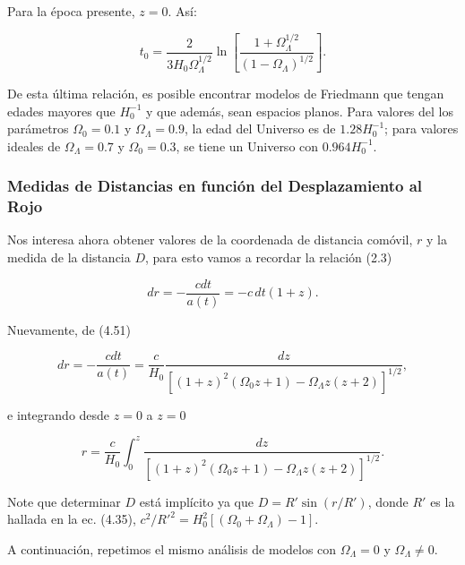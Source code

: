 \documentclass[11pt]{article}
\begin{document}
\begin{itemize}
        Para la época presente, $z=0$. Así: 
        
        \begin{equation}
            t_0 = \frac{2}{3H_0\Omega_{\Lambda}^{1/2}} \ln \left[\frac{1 + \Omega_{\Lambda}^{1/2}}{(1-\Omega_{\Lambda})^{1/2}} \right].
        \end{equation}
        
        De esta última relación, es posible encontrar modelos de Friedmann que tengan edades mayores que $H_0^{-1}$ y que además, sean espacios planos. Para valores del los parámetros $\Omega_0 = 0.1$ y $\Omega_{\Lambda}=0.9$, la edad del Universo es de $1.28 H_0^{-1}$; para valores ideales de $\Omega_{\Lambda} = 0.7$ y $\Omega_0=0.3$, se tiene un Universo con $0.964 H_0^{-1}$. 
    
    \end{itemize}
    
    \subsubsection{Medidas de Distancias en función del Desplazamiento al Rojo}
    
   Nos interesa ahora obtener valores de la coordenada de distancia comóvil, $r$ y la medida de la distancia $D$, para esto vamos a recordar la relación (2.3)
   
   \begin{equation}
       dr = - \frac{cdt}{a(t)} = -c \, dt (1+z).
   \end{equation}
    
    Nuevamente, de (4.51)
    
    \begin{equation}
         dr = - \frac{cdt}{a(t)} = \frac{c}{H_0}  \frac{dz}{[ (1+z)^2 (\Omega_0 z + 1) - \Omega_{\Lambda} z (z+2) ]^{1/2}},
    \end{equation}
    
    e integrando desde $z=0$ a $z=0$
    
    \begin{equation}
        r = \frac{c}{H_0} \int_0^z{\frac{dz}{[ (1+z)^2 (\Omega_0 z + 1) - \Omega_{\Lambda} z (z+2) ]^{1/2}}}.
    \end{equation}
    
    
    Note que determinar $D$ está implícito ya que $D = R' \sin(r/R')$, donde $R'$ es la hallada en la ec. (4.35), $ c^2/R'^2  = H_0^2 [(\Omega_0 + \Omega_{\Lambda}) - 1]$. 
    
    A continuación, repetimos el mismo análisis de modelos con $\Omega_{\Lambda} =0$ y $\Omega_{\Lambda} \neq 0$. 
    
\end{document}
